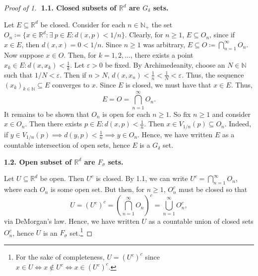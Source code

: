 \begin{proof}[Proof of 1]$ $\newline
	\textbf{1.1. Closed subsets of \( \mathbb{R}^{d}  \) are \( G_\delta  \) sets.}

Let \( E \subseteq \mathbb{R}^{d}  \) be closed. Consider for each \( n \in \mathbb{N}_+  \) the set \( O_n \coloneqq \{ x \in \mathbb{R}^{d}  : \exists  \ p \in E : d(x,p) < 1/n  \} \). Clearly, for \( n \geq 1 \), \( E \subseteq O_n \), since if \( x \in E \), then \( d(x,x) = 0 < 1/n \). Since \( n \geq 1 \) was arbitrary, \( E \subseteq O \coloneqq \bigcap_{n=1}^{\infty} O_n. \) Now suppose \( x \in O. \) Then, for \( k = 1, 2, \hdots  \), there exists a point \( x_k \in E : d(x, x_k) < \frac{1}{k}  \). Let \( \varepsilon > 0 \) be fixed. By Archimedeanity, choose an \( N \in \mathbb{N}  \) such that \( 1/N < \varepsilon  \). Then if \( n > N \), \( d(x, x_n) < \frac{1}{n} < \frac{1}{N} < \varepsilon  \). Thus, the sequence \( (x_k)_{k \in \mathbb{N} } \subseteq E \) converges to \( x \). Since \( E \) is closed, we must have that \( x \in E \). Thus, \[E = O =  \bigcap_{n=1}^{\infty} O_n.\] It remains to be shown that \( O_n \) is open for each \( n \geq 1 \). So fix \( n \geq 1 \) and consider \( x \in O_n \). Then there exists \( p \in E : d(x,p) < \frac{1}{n}  \). Then \( x \in V_{1/n}(p) \subseteq O_n\). Indeed, if \( y \in V_{1/n}(p) \implies d(y, p) < \frac{1}{n} \implies y \in O_n.  \) Hence, we have written \( E \) as a countable intersection of open sets, hence \( E \) is a \( G_\delta  \) set.

\noindent \textbf{1.2. Open subset of \( \mathbb{R}^{d}  \) are \( F_\sigma  \) sets.}

Let \( U \subseteq \mathbb{R}^{d}  \) be open. Then \( U^{c}  \) is closed. By 1.1, we can write \( U^{c} = \bigcap_{n=1}^{\infty} O_n  \), where each \( O_n \) is some open set. But then, for \( n \geq 1 \), \( O_n^{c}  \) must be closed so that \[U = (U^{c})^{c} = \left ( {\bigcap_{n=1}^{\infty} O_n} \right ) ^{c} =   \bigcup_{n=1}^{\infty} O_n^c, \] via DeMorgan's law. Hence, we have written \( U \) as a countable union of closed sets \( O_n^{c}  \), hence \( U \) is an \( F_\sigma  \) set.\footnote{For the sake of completeness, \( U = (U^{c})^{c}   \) since \( x \in U \iff x \notin U^{c} \iff x \in (U^{c})^{c}    \).}
\end{proof}
